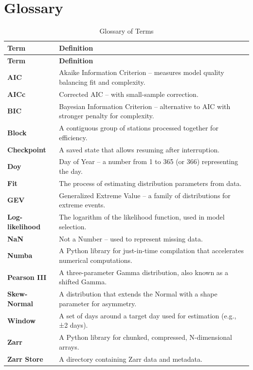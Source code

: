 ﻿\documentclass[12pt,a4paper]{report}
\begin{document}
\chapter{Glossary}
\begin{longtable}{p{3cm} p{10cm}}
    \caption{Glossary of Terms}
    \label{tab:glossary} \\
    \toprule
    \textbf{Term} & \textbf{Definition} \\
    \midrule
    \endfirsthead
    \toprule
    \textbf{Term} & \textbf{Definition} \\
    \midrule
    \endhead
    \bottomrule
    \endfoot
    
    \textbf{AIC} & Akaike Information Criterion – measures model quality balancing fit and complexity. \\
    \textbf{AICc} & Corrected AIC – with small-sample correction. \\
    \textbf{BIC} & Bayesian Information Criterion – alternative to AIC with stronger penalty for complexity. \\
    \textbf{Block} & A contiguous group of stations processed together for efficiency. \\
    \textbf{Checkpoint} & A saved state that allows resuming after interruption. \\
    \textbf{Doy} & Day of Year – a number from 1 to 365 (or 366) representing the day. \\
    \textbf{Fit} & The process of estimating distribution parameters from data. \\
    \textbf{GEV} & Generalized Extreme Value – a family of distributions for extreme events. \\
    \textbf{Log-likelihood} & The logarithm of the likelihood function, used in model selection. \\
    \textbf{NaN} & Not a Number – used to represent missing data. \\
    \textbf{Numba} & A Python library for just-in-time compilation that accelerates numerical computations. \\
    \textbf{Pearson III} & A three-parameter Gamma distribution, also known as a shifted Gamma. \\
    \textbf{Skew-Normal} & A distribution that extends the Normal with a shape parameter for asymmetry. \\
    \textbf{Window} & A set of days around a target day used for estimation (e.g., ±2 days). \\
    \textbf{Zarr} & A Python library for chunked, compressed, N-dimensional arrays. \\
    \textbf{Zarr Store} & A directory containing Zarr data and metadata. \\
    
\end{longtable}
\end{document}
